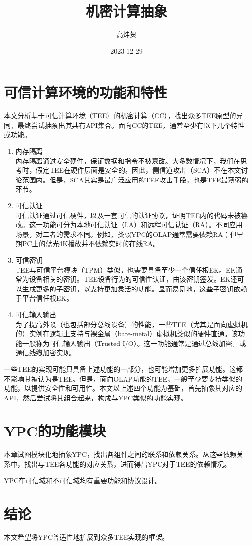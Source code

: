 \documentclass[12pt, letterpaper]{report}
\begin{document}
\title{机密计算抽象}
\author{高炜贺}
\date{2023-12-29}
\maketitle

\newpage

\chapter{可信计算环境的功能和特性}

本文分析基于可信计算环境（TEE）的机密计算（CC），找出众多TEE原型的异同，最终尝试抽象出其共有API集合。面向CC的TEE，通常至少有以下几个特性或功能。

\begin{enumerate}
    \item 内存隔离\\
    内存隔离通过安全硬件，保证数据和指令不被篡改。大多数情况下，我们在思考时，假定TEE在硬件层面是安全的。因此，侧信道攻击（SCA）不在本文讨论范围内。但是，SCA其实是最广泛应用的TEE攻击手段，也是TEE最薄弱的环节。
    \item 可信认证\\
    可信认证通过可信硬件，以及一套可信的认证协议，证明TEE内的代码未被篡改。这一功能可分为本地可信认证（LA）和远程可信认证（RA）。不同应用场景，对二者的需求不同。例如，类似YPC的OLAP通常需要依赖RA；但早期PC上的蓝光4K播放并不依赖实时的在线RA。
    \item 可信密钥\\
    TEE与可信平台模块（TPM）类似，也需要具备至少一个信任根EK。EK通常为设备相关的密钥。TEE设备行为的可信性认证，由该密钥签发。EK还可以生成更多的子密钥，以支持更加灵活的功能。显而易见地，这些子密钥依赖于平台信任根EK。
    \item 可信输入输出\\
    为了提高外设（也包括部分总线设备）的性能，一些TEE（尤其是面向虚拟机的）实例在逻辑上支持与裸金属（bare-metal）虚拟机类似的硬件直通。该功能一般称为可信输入输出（Trusted I/O）。这一功能通常是通过总线加密，或通信线缆加密实现。
\end{enumerate}

一些TEE的实现可能只具备上述功能的一部分，也可能增加更多扩展功能。这都不影响其被认为是TEE。但是，面向OLAP功能的TEE，一般至少要支持类似的功能，以提供安全性和可用性。本文以上述四个功能为基础，首先抽象其对应的API，然后尝试将其组合起来，构成与YPC类似的功能实现。

\chapter{YPC的功能模块}

本章试图模块化地抽象YPC，找出各组件之间的联系和依赖关系。从这些依赖关系中，找出与TEE各功能的对应关系，进而得出YPC对于TEE的依赖情况。

YPC在可信域和不可信域均有重要功能和协议设计。

\chapter{结论}

本文希望将YPC普适性地扩展到众多TEE实现的框架。
\end{document}
